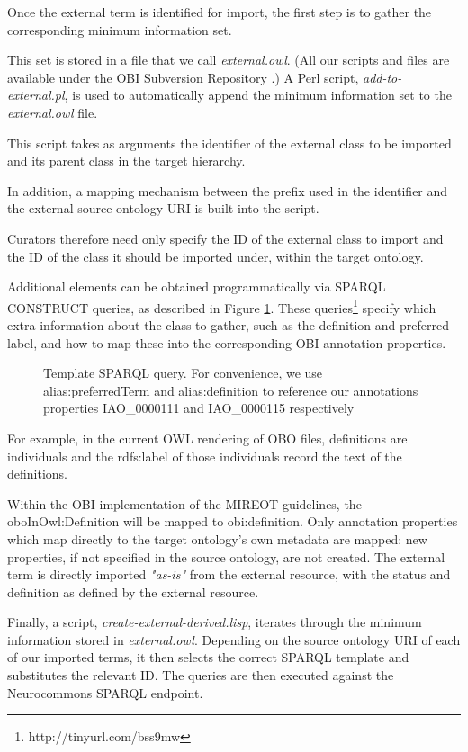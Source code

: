 \documentclass{ao2e}%
\begin{document}
Once the external term is identified for import, the first step is to gather the corresponding minimum information set.

This set is stored in a file that we call \emph{external.owl}. (All our scripts and files are available under the \ac{OBI} Subversion Repository \cite{OBIScripts}.)
A Perl script, \emph{add-to-external.pl}, is used to automatically append the minimum information set to the \emph{external.owl} file. 

This script takes as arguments the identifier of the external class to be imported and its parent class in the target hierarchy.

In addition, a mapping mechanism between the prefix used in the identifier and the external source ontology URI is built into the script.

Curators therefore need only specify the ID of the external class to import and the ID of the class it should be imported under, within the target ontology.


Additional elements can be obtained programmatically via SPARQL\cite{SPARQL} CONSTRUCT queries, as described in Figure \ref{fig:sparql}.
These queries\footnote{http://tinyurl.com/bss9mw} specify which extra information about the class to gather, such as the definition and preferred label, and how to map these into the corresponding OBI annotation properties. 

\begin{figure}[t]
\scriptsize
 
\caption{Template SPARQL query. For convenience, we use alias:preferredTerm and
alias:definition to reference our annotations properties IAO\_0000111 and IAO\_0000115 \cite{IAO} respectively}
\label{fig:sparql}
\end{figure}


For example, in the current \ac{OWL} rendering of \ac{OBO} files, definitions are individuals and the rdfs:label of those individuals record the text of the definitions. 

Within the \ac{OBI} implementation of the \ac{MIREOT} guidelines, the oboInOwl:Definition will be mapped to obi:definition. Only annotation properties which map directly to the target ontology's own metadata are mapped: new properties, if not specified in the source ontology, are not created. The external term is directly imported \emph{"as-is"} from the external resource, with the status and definition as defined by the external resource.

Finally, a script, \emph{create-external-derived.lisp}, iterates through the minimum information stored in \emph{external.owl}.
Depending on the source ontology URI of each of our imported terms, it then selects the correct SPARQL template and substitutes the relevant ID.
The queries are then executed against the Neurocommons SPARQL endpoint\cite{Neurocommons}.
\end{document}
